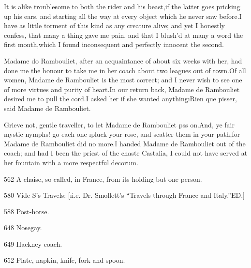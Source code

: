 \documentclass[twoside]{article}
\begin{document}
It is alike troublesome to both the rider and his beast,\tsk if the latter
goes pricking up his ears, and starting all the way at every object which
he never saw before.\tsk I have as little torment of this kind as any
creature alive; and yet I honestly confess, that many a thing gave me
pain, and that I blush’d at many a word the first month,\tsk which I found
inconsequent and perfectly innocent the second.

Madame do Rambouliet, after an acquaintance of about six weeks with her,
had done me the honour to take me in her coach about two leagues out of
town.\tsk Of all women, Madame de Rambouliet is the most correct; and I never
wish to see one of more virtues and purity of heart.\tsk In our return back,
Madame de Rambouliet desired me to pull the cord.\tsk I asked her if she
wanted anything\tsk \i{Rien que pisser}, said Madame de Rambouliet.

Grieve not, gentle traveller, to let Madame de Rambouliet p\tsk ss on.\tsk And,
ye fair mystic nymphs! go each one \i{pluck your rose}, and scatter them in
your path,\tsk for Madame de Rambouliet did no more.\tsk I handed Madame de
Rambouliet out of the coach; and had I been the priest of the chaste
Castalia, I could not have served at her fountain with a more respectful
decorum.








{562}  A chaise, so called, in France, from its holding but one person.

{580}  Vide S\tsk ’s Travels: [\i{i.e.} Dr. Smollett’s “Travels through France
and Italy.”\tsk ED.]

{588}  Post-horse.

{648}  Nosegay.

{649}  Hackney coach.

{652}  Plate, napkin, knife, fork and spoon.
\end{document}
